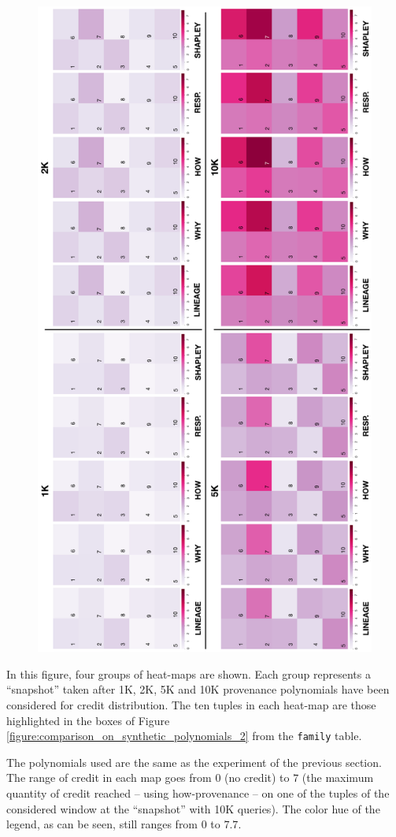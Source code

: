 \begin{figure}[h!]
\centering
  \includegraphics[width=.60\textwidth]{figures/experiments/comparison}
  \caption{}
  \label{fig:comparison}
\end{figure}

In this figure, four groups of heat-maps are shown. Each group represents a ``snapshot'' taken %
after 1K, 2K, 5K and 10K provenance polynomials have been considered for credit distribution.  
The ten tuples in each heat-map  %
are those  highlighted in the  boxes of Figure \ref{figure:comparison_on_synthetic_polynomials_2} from the \texttt{family} table.  


The polynomials used are the same as the experiment of the previous section. The range of credit in each map goes from 0 (no credit) to $7$ (the maximum quantity of credit reached -- using how-provenance -- on one of the tuples of the considered window at the ``snapshot'' with 10K queries). The color hue of the legend, as can be seen, still ranges from $0$ to $7.7$.

